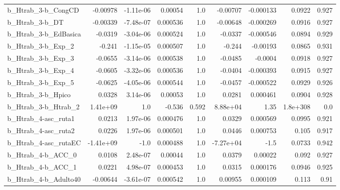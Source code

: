 \begin{tabular}{lrrrrrrrr}
b\_Htrab\_3-b\_CongCD         &    -0.00978 &    -1.11e-06 &   0.00054 &      1.0 &   -0.00707 &   -0.000133 &       0.0922 &         0.927 \\
b\_Htrab\_3-b\_DT             &    -0.00339 &    -7.48e-07 &  0.000536 &      1.0 &   -0.00648 &   -0.000269 &       0.0916 &         0.927 \\
b\_Htrab\_3-b\_EdBasica       &     -0.0319 &    -3.04e-06 &  0.000524 &      1.0 &    -0.0337 &   -0.000546 &       0.0894 &         0.929 \\
b\_Htrab\_3-b\_Exp\_2          &      -0.241 &    -1.15e-05 &  0.000507 &      1.0 &     -0.244 &    -0.00193 &       0.0865 &         0.931 \\
b\_Htrab\_3-b\_Exp\_3          &     -0.0655 &    -3.14e-06 &  0.000538 &      1.0 &    -0.0485 &     -0.0004 &       0.0918 &         0.927 \\
b\_Htrab\_3-b\_Exp\_4          &     -0.0605 &    -3.32e-06 &  0.000536 &      1.0 &    -0.0404 &   -0.000393 &       0.0915 &         0.927 \\
b\_Htrab\_3-b\_Exp\_5          &     -0.0625 &    -4.05e-06 &  0.000544 &      1.0 &    -0.0457 &   -0.000522 &       0.0929 &         0.926 \\
b\_Htrab\_3-b\_Hpico          &      0.0328 &     3.14e-06 &   0.00053 &      1.0 &     0.0281 &    0.000461 &       0.0904 &         0.928 \\
b\_Htrab\_3-b\_Htrab\_2        &    1.41e+09 &          1.0 &    -0.536 &    0.592 &   8.88e+04 &        1.35 &     1.8e+308 &           0.0 \\
b\_Htrab\_4-asc\_ruta1        &      0.0213 &     1.97e-06 &  0.000476 &      1.0 &     0.0329 &    0.000569 &       0.0995 &         0.921 \\
b\_Htrab\_4-asc\_ruta2        &      0.0226 &     1.97e-06 &  0.000501 &      1.0 &     0.0446 &    0.000753 &        0.105 &         0.917 \\
b\_Htrab\_4-asc\_rutaEC       &   -1.41e+09 &         -1.0 &  0.000488 &      1.0 &  -7.27e+04 &        -1.5 &       0.0733 &         0.942 \\
b\_Htrab\_4-b\_ACC\_0          &      0.0108 &     2.48e-07 &   0.00044 &      1.0 &     0.0379 &     0.00022 &        0.092 &         0.927 \\
b\_Htrab\_4-b\_ACC\_1          &      0.0221 &     4.98e-07 &  0.000453 &      1.0 &     0.0315 &    0.000176 &       0.0946 &         0.925 \\
b\_Htrab\_4-b\_Adulto40       &    -0.00644 &    -3.61e-07 &  0.000542 &      1.0 &    0.00955 &    0.000109 &        0.113 &          0.91 \\

\end{tabular}
